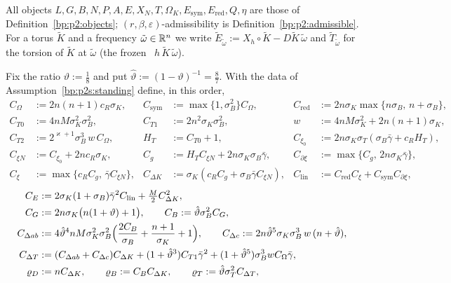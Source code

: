 All objects $L,G,B,N,P,A,E,X_N,T,\Omega_K,E_{\mathrm{sym}},E_{\mathrm{red}},Q,\eta$ are those of
Definition~\ref{bp:p2:objects}; $(r,\beta,\varepsilon)$-admissibility is Definition~\ref{bp:p2:admissible}. For a
torus $\tilde K$ and a frequency $\tilde\omega\in\mathbb{R}^n$ we write $\tilde E_{\tilde\omega}:=X_h\circ\tilde K-D\tilde
K\,\tilde\omega$ and $\tilde T_{\tilde\omega}$ for the torsion of $\tilde K$ at $\tilde\omega$ (the frozen
~$h\,\tilde K\,\tilde\omega$).

\begin{definition}[Constants]\label{bp:p2s:constants}
Fix the ratio $\vartheta:=\frac18$ and put $\hat\vartheta:=(1-\vartheta)^{-1}=\frac87$. With the data of
Assumption~\ref{bp:p2s:standing} define, in this order,
\begin{align*}
C_\Omega&:=2n(n+1)c_R\sigma_K, & C_{\mathrm{sym}}&:=\max\{1,\sigma_B^2\}C_\Omega, &
C_{\mathrm{red}}&:=2n\sigma_K\max\{n\sigma_B,\,n+\sigma_B\},\\
C_{T0}&:=4nM\sigma_K^2\sigma_B^2, & C_{T1}&:=2n^2\sigma_K\sigma_B^2, &
w&:=4nM\sigma_K^2+2n(n+1)\sigma_K,\\
C_{T2}&:=2^{\varkappa+1}\sigma_B^3\,w\,C_\Omega, & H_T&:=C_{T0}+1, &
C_{\xi_0}&:=2n\sigma_K\sigma_T(\sigma_B\bar\gamma+c_RH_T),\\
C_{\xi N}&:=C_{\xi_0}+2nc_R\sigma_K, & C_g&:=H_TC_{\xi N}+2n\sigma_K\sigma_B\bar\gamma, &
C_{\partial\xi}&:=\max\{C_g,\,2n\sigma_K\bar\gamma\},\\
C_\xi&:=\max\{c_RC_g,\,\bar\gamma C_{\xi N}\}, & C_{\Delta K}&:=\sigma_K(c_RC_g+\sigma_B\bar\gamma C_{\xi N}), &
C_{\mathrm{lin}}&:=C_{\mathrm{red}}C_\xi+C_{\mathrm{sym}}C_{\partial\xi},
\end{align*}
\begin{align*}
C_E&:=2\sigma_K(1+\sigma_B)\bar\gamma^2C_{\mathrm{lin}}+\tfrac M2C_{\Delta K}^2,\\
C_G&:=2n\sigma_K\bigl(n(1+\vartheta)+1\bigr),\qquad C_B:=\hat\vartheta\sigma_B^2C_G,\\
C_{\Delta ab}&:=4\hat\vartheta^4nM\sigma_K^2\sigma_B^2\Bigl(\frac{2C_B}{\sigma_B}+\frac{n+1}{\sigma_K}+1\Bigr),\qquad
C_{\Delta c}:=2n\hat\vartheta^5\sigma_K\sigma_B^3\,w\,(n+\hat\vartheta),\\
C_{\Delta T}&:=(C_{\Delta ab}+C_{\Delta c})C_{\Delta K}+(1+\hat\vartheta^3)C_{T1}\bar\gamma^2
  +(1+\hat\vartheta^5)\sigma_B^3wC_\Omega\bar\gamma,\\
\varrho_D&:=nC_{\Delta K},\qquad\varrho_B:=C_BC_{\Delta K},\qquad\varrho_T:=\hat\vartheta\sigma_T^2C_{\Delta T},\\

\end{align*}
\end{definition}
